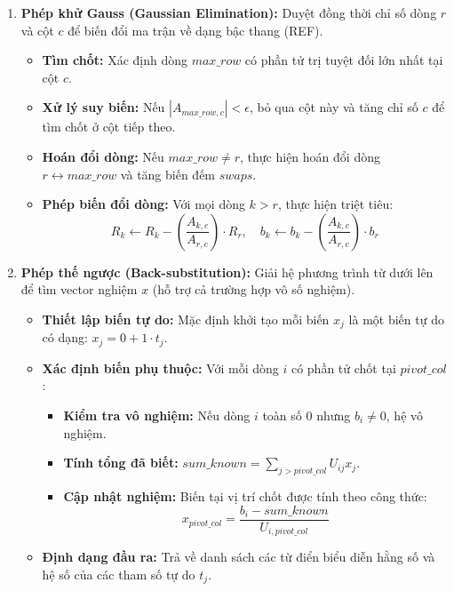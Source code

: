 \documentclass[12pt,a4paper]{article}
\begin{document}
\begin{enumerate}[label=\textbf{\alph*) Bước \arabic*:}, leftmargin=*, align=left]
\item \textbf{Phép khử Gauss (Gaussian Elimination):}
Duyệt đồng thời chỉ số dòng $r$ và cột $c$ để biến đổi ma trận về dạng bậc thang (REF).
\begin{itemize}[leftmargin=1.5em]
    \item \textbf{Tìm chốt:} Xác định dòng $max\_row$ có phần tử trị tuyệt đối lớn nhất tại cột $c$.
    \item \textbf{Xử lý suy biến:} Nếu $|A_{max\_row, c}| < \epsilon$, bỏ qua cột này và tăng chỉ số $c$ để tìm chốt ở cột tiếp theo.
    \item \textbf{Hoán đổi dòng:} Nếu $max\_row \neq r$, thực hiện hoán đổi dòng $r \leftrightarrow max\_row$ và tăng biến đếm $swaps$.
    \item \textbf{Phép biến đổi dòng:} Với mọi dòng $k > r$, thực hiện triệt tiêu:
    \begin{equation}
    R_k \leftarrow R_k - \left( \frac{A_{k,c}}{A_{r,c}} \right) \cdot R_r, \quad b_k \leftarrow b_k - \left( \frac{A_{k,c}}{A_{r,c}} \right) \cdot b_r
    \end{equation}
\end{itemize}

\item \textbf{Phép thế ngược (Back-substitution):}
Giải hệ phương trình từ dưới lên để tìm vector nghiệm $x$ (hỗ trợ cả trường hợp vô số nghiệm).
\begin{itemize}[leftmargin=1.5em]
    \item \textbf{Thiết lập biến tự do:} Mặc định khởi tạo mỗi biến $x_j$ là một biến tự do có dạng: $x_j = 0 + 1 \cdot t_j$.
    \item \textbf{Xác định biến phụ thuộc:} Với mỗi dòng $i$ có phần tử chốt tại $pivot\_col$:
    \begin{itemize}
        \item \textbf{Kiểm tra vô nghiệm:} Nếu dòng $i$ toàn số $0$ nhưng $b_i \neq 0$, hệ vô nghiệm.
        \item \textbf{Tính tổng đã biết:} $sum\_known = \displaystyle\sum_{j > pivot\_col} U_{ij} x_j$.
        \item \textbf{Cập nhật nghiệm:} Biến tại vị trí chốt được tính theo công thức:
        \begin{equation}
        x_{pivot\_col} = \frac{b_i - sum\_known}{U_{i, pivot\_col}}
        \end{equation}
    \end{itemize}
    \item \textbf{Định dạng đầu ra:} Trả về danh sách các từ điển biểu diễn hằng số và hệ số của các tham số tự do $t_j$.
\end{itemize}
\end{enumerate}
\end{document}
